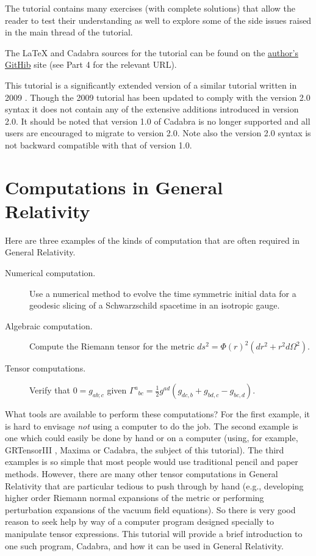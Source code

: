 \documentclass[a4paper,12pt]{article}
\numberwithin{equation}{section}%
\begin{document}
The tutorial contains many exercises (with complete solutions) that allow the reader to test
their understanding as well to explore some of the side issues raised in the main thread of
the tutorial.

The LaTeX and Cadabra sources for the tutorial can be found on the
\href{https://github.com/leo-brewin/cadabra-tutorial}{author's GitHib} site
(see Part 4 for the relevant URL).

This tutorial is a significantly extended version of a similar tutorial written in 2009
\cite{brewin:2009-02}. Though the 2009 tutorial has been updated to comply with the
version 2.0 syntax it does not contain any of the extensive additions introduced in version
2.0. It should be noted that version 1.0 of Cadabra is no longer supported and all users are
encouraged to migrate to version 2.0. Note also the version 2.0 syntax is not backward
compatible with that of version 1.0.

\clearpage

\section*{Computations in General Relativity}

Here are three examples of the kinds of computation that are often required in General
Relativity.

\begin{description}
\item[Numerical computation.]\hfil\break\vskip-15pt
Use a numerical method to evolve the time symmetric initial data for a geodesic slicing of a
Schwarzschild spacetime in an isotropic gauge.

\item[Algebraic computation.]\hfil\break\vskip-15pt
Compute the Riemann tensor for the metric $ds^2=\Phi(r)^2\left(dr^2+r^2d\Omega^2\right)$.

\item[Tensor computations.]\hfil\break\vskip-15pt
Verify that $0=g_{ab;c}$ given
$\Gamma^{a}{}_{bc} = \frac{1}{2}g^{ad}\left(g_{dc,b} + g_{bd,c} - g_{bc,d}\right)$.
\end{description}

What tools are available to perform these computations? For the first example, it is hard to
envisage \emph{not} using a computer to do the job. The second example is one which could
easily be done by hand or on a computer (using, for example, GRTensorIII
\cite{grtensorIII:2017-01}, Maxima \cite{maxima:2014-01} or Cadabra, the subject of this
tutorial). The third examples is so simple that most people would use traditional pencil and
paper methods. However, there are many other tensor computations in General Relativity that
are particular tedious to push through by hand (e.g., developing higher order Riemann normal
expansions of the metric or performing perturbation expansions of the vacuum field
equations). So there is very good reason to seek help by way of a computer program designed
specially to manipulate tensor expressions. This tutorial will provide a brief introduction
to one such program, Cadabra, and how it can be used in General Relativity.
\end{document}

